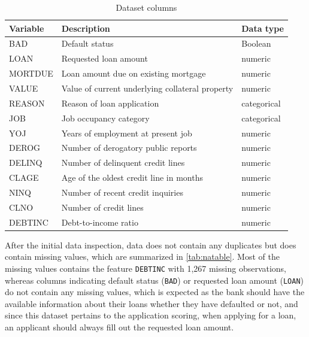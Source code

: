 \begin{table}[H]
\small
\setlength{\tabcolsep}{8pt}
\renewcommand{\arraystretch}{1.3}
\begin{center}
\caption[Dataset columns]{Dataset columns}\label{tab:dataset}
\begin{tabular}{@{} l p{8cm} l @{}}
\toprule
\textbf{Variable} & \textbf{Description} & \textbf{Data type}\\
\midrule
\hline
BAD & Default status & Boolean \\

LOAN & Requested loan amount & numeric \\

MORTDUE & Loan amount due on existing mortgage & numeric \\

VALUE & Value of current underlying collateral property & numeric \\

REASON & Reason of loan application & categorical \\
JOB & Job occupancy category & categorical \\

YOJ & Years of employment at present job & numeric \\

DEROG & Number of derogatory public reports & numeric \\

DELINQ & Number of delinquent credit lines & numeric \\

CLAGE & Age of the oldest credit line in months & numeric \\

NINQ & Number of recent credit inquiries & numeric \\

CLNO & Number of credit lines & numeric \\

DEBTINC & Debt-to-income ratio & numeric \\
\hline
\bottomrule
\end{tabular}
\end{center}
\begin{center} %
\end{center}
\end{table}

After the initial data inspection, data does not contain any duplicates but does contain missing values, which are summarized in \autoref{tab:natable}.
Most of the missing values contains the feature \texttt{DEBTINC} with 1,267 missing observations, whereas columns indicating default status (\texttt{BAD}) or requested loan amount (\texttt{LOAN}) do not contain any missing values, which is expected as the bank should have the available information about their loans whether they have defaulted or not, and since this dataset pertains to the application scoring, when applying for a loan, an applicant should always fill out the requested loan amount.

